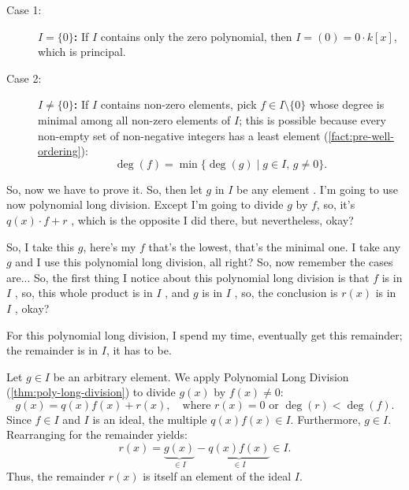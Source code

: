 \begin{proofWrapper}
\begin{content}
\begin{description}
    \item[Case 1:] \textbf{$I = \{0\}$:} If $I$ contains only the zero polynomial, then $I = (0) = 0 \cdot k[x]$, which is principal.
    \item[Case 2:] \textbf{$I \neq \{0\}$:} If $I$ contains non-zero elements, pick $f \in I \setminus \{0\}$ whose degree is minimal among all non-zero elements of $I$; this is possible because every non-empty set of non-negative integers has a least element (\cref{fact:pre-well-ordering}):
    \begin{equation}\label{eq:minimal-degree-f}
    \deg(f) = \min \{ \deg(g) \mid g \in I, \, g \neq 0 \}.
    \end{equation}
\end{description}
\end{content}

\begin{speech}[00:35:48 - 00:37:19]
So, now we have to prove it. So, then let $g$ in $I$ be any element . I'm going to use now polynomial long division. Except I'm going to divide $g$ by $f$, so, it's $q(x) \cdot f + r$ , which is the opposite I did there, but nevertheless, okay?

So, I take this $g$, here's my $f$ that's the lowest, that's the minimal one. I take any $g$ and I use this polynomial long division, all right? So, now remember the cases are... So, the first thing I notice about this polynomial long division is that $f$ is in $I$ , so, this whole product is in $I$ , and $g$ is in $I$ , so, the conclusion is $r(x)$ is in $I$ , okay?

For this polynomial long division, I spend my time, eventually get this remainder; the remainder is in $I$, it has to be.
\end{speech}

\begin{content}
Let $g \in I$ be an arbitrary element. We apply Polynomial Long Division (\cref{thm:poly-long-division}) to divide $g(x)$ by $f(x) \neq 0$:
\begin{equation}\label{eq:div-g-by-f}
g(x) = q(x) f(x) + r(x), \quad \text{where } r(x) = 0 \text{ or } \deg(r) < \deg(f).
\end{equation}
Since $f \in I$ and $I$ is an ideal, the multiple $q(x) f(x) \in I$. Furthermore, $g \in I$.
Rearranging for the remainder yields:
\begin{equation}\label{eq:remainder-in-ideal}
r(x) = \underbrace{g(x)}_{\in I} - \underbrace{q(x) f(x)}_{\in I} \in I.
\end{equation}
Thus, the remainder $r(x)$ is itself an element of the ideal $I$.
\end{content}


\end{proofWrapper}
